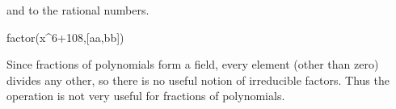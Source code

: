 {{{{{{{{{{{\begin{xtc}
\begin{xtccomment}
and  to the rational numbers.
\end{xtccomment}
\begin{spadsrc}
factor(x^6+108,[aa,bb]) 
\end{spadsrc}
\begin{TeXOutput}
\begin{fricasmath}{9}
%
\TIMES {}\TIMES %
\TIMES {}\TIMES {}\TIMES {}%
\end{fricasmath}
\end{TeXOutput}
\end{xtc}


Since fractions of polynomials form a field, every element (other than zero)
divides any other, so there is no useful notion of irreducible factors.
Thus the  operation is not very useful for fractions
of polynomials.

}}}}}}}}}}}
